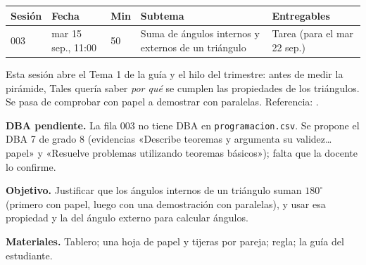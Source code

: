 \documentclass[11pt]{article}
\begin{document}
\encabezado*

\begin{center}
{\renewcommand{\arraystretch}{1.3}
\begin{tabularx}{\linewidth}{@{}l l l X l@{}}
  \toprule
  \textbf{Sesión} & \textbf{Fecha} & \textbf{Min} & \textbf{Subtema} & \textbf{Entregables}\\
  \midrule
  003 & mar 15 sep., 11:00 & 50 & Suma de ángulos internos y externos de un triángulo
      & Tarea (para el mar 22 sep.)\\
  \bottomrule
\end{tabularx}}
\end{center}

Esta sesión abre el Tema 1 de la guía y el hilo del trimestre: antes de medir la pirámide,
Tales quería saber \emph{por qué} se cumplen las propiedades de los triángulos. Se pasa de
comprobar con papel a demostrar con paralelas.
Referencia: .

\begin{nota}
\textbf{DBA pendiente.} La fila 003 no tiene DBA en \texttt{programacion.csv}. Se propone
el DBA 7 de grado 8 (evidencias «Describe teoremas y argumenta su validez\ldots{} papel» y
«Resuelve problemas utilizando teoremas básicos»); falta que la docente lo confirme.
\end{nota}


\textbf{Objetivo.} Justificar que los ángulos internos de un triángulo suman $180^\circ$
(primero con papel, luego con una demostración con paralelas), y usar esa propiedad y la
del ángulo externo para calcular ángulos.

\textbf{Materiales.} Tablero; una hoja de papel y tijeras por pareja; regla; la guía del
estudiante.
\end{document}

